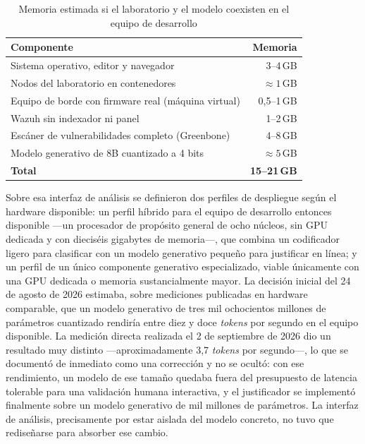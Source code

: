 \begin{table}[H]
  \centering
  \caption{Memoria estimada si el laboratorio y el modelo coexisten en el equipo de desarrollo}
  \label{tab:memoria}
  \begin{tabular}{@{}p{}r@{}}
    \toprule
    \textbf{Componente} & \textbf{Memoria} \\
    \midrule
    Sistema operativo, editor y navegador & 3--4\,GB \\
    Nodos del laboratorio en contenedores & $\approx 1$\,GB \\
    Equipo de borde con firmware real (máquina virtual) & 0,5--1\,GB \\
    Wazuh sin indexador ni panel & 1--2\,GB \\
    Escáner de vulnerabilidades completo (Greenbone) & 4--8\,GB \\
    Modelo generativo de 8B cuantizado a 4 bits & $\approx 5$\,GB \\
    \midrule
    \textbf{Total} & \textbf{15--21\,GB} \\
    \bottomrule
  \end{tabular}
\end{table}

Sobre esa interfaz de análisis se definieron dos perfiles de despliegue según el hardware
disponible: un perfil híbrido para el equipo de desarrollo entonces disponible ---un procesador de
propósito general de ocho núcleos, sin GPU dedicada y con dieciséis gigabytes de memoria---, que
combina un codificador ligero para clasificar con un modelo generativo pequeño para justificar en
línea; y un perfil de un único componente generativo especializado, viable únicamente con una GPU
dedicada o memoria sustancialmente mayor. La decisión inicial del 24 de agosto de 2026 estimaba,
sobre mediciones publicadas en hardware comparable, que un modelo generativo de tres mil ochocientos
millones de parámetros cuantizado rendiría entre diez y doce \emph{tokens} por segundo en el equipo
disponible. La medición directa realizada el 2 de septiembre de 2026 dio un resultado muy distinto
---aproximadamente 3,7 \emph{tokens} por segundo---, lo que se documentó de inmediato como una
corrección y no se ocultó: con ese rendimiento, un modelo de ese tamaño quedaba fuera del
presupuesto de latencia tolerable para una validación humana interactiva, y el justificador se
implementó finalmente sobre un modelo generativo de mil millones de parámetros. La interfaz de
análisis, precisamente por estar aislada del modelo concreto, no tuvo que rediseñarse para absorber
ese cambio.

